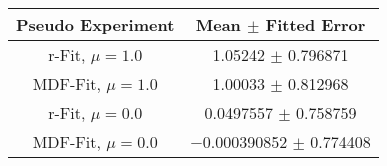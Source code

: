 \begin{table}
\centering
\begin{tabular}{cc}
\toprule
Pseudo Experiment & Mean $\pm$ Fitted Error\\
\midrule
r-Fit, $\mu=\num[round-precision=1]{1.0}$ & \num{1.05242} $\pm$ \num{0.796871}\\
MDF-Fit, $\mu=\num[round-precision=1]{1.0}$ & \num{1.00033} $\pm$ \num{0.812968}\\
r-Fit, $\mu=\num[round-precision=1]{0.0}$ & \num{0.0497557} $\pm$ \num{0.758759}\\
MDF-Fit, $\mu=\num[round-precision=1]{0.0}$ & \num{-0.000390852} $\pm$ \num{0.774408}\\
\bottomrule
\end{tabular}
\end{table}